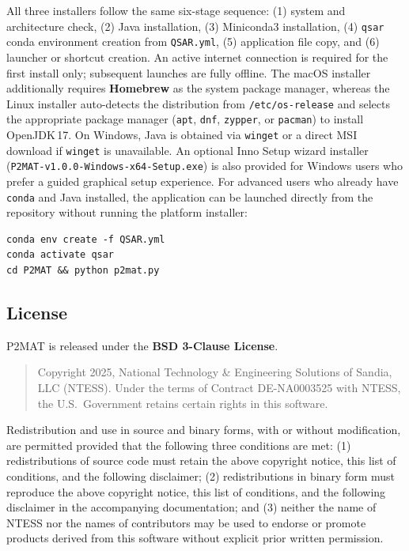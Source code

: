 All three installers follow the same six-stage sequence: (1) system and
architecture check, (2) Java installation, (3) Miniconda3 installation,
(4) \texttt{qsar} conda environment creation from \texttt{QSAR.yml},
(5) application file copy, and (6) launcher or shortcut creation.
An active internet connection is required for the first install only;
subsequent launches are fully offline.
The macOS installer additionally requires \textbf{Homebrew} as the system
package manager, whereas the Linux installer auto-detects the distribution
from \texttt{/etc/os-release} and selects the appropriate package manager
(\texttt{apt}, \texttt{dnf}, \texttt{zypper}, or \texttt{pacman}) to install
OpenJDK\,17.
On Windows, Java is obtained via \texttt{winget} or a direct MSI download
if \texttt{winget} is unavailable.
An optional Inno Setup wizard installer
(\texttt{P2MAT-v1.0.0-Windows-x64-Setup.exe}) is also provided for Windows
users who prefer a guided graphical setup experience.
For advanced users who already have \texttt{conda} and Java installed, the
application can be launched directly from the repository without running the
platform installer:

\begin{verbatim}
conda env create -f QSAR.yml
conda activate qsar
cd P2MAT && python p2mat.py
\end{verbatim}

\subsection{License}
\label{subsec:license}

P2MAT is released under the \textbf{BSD 3-Clause License}.

\begin{quote}
Copyright \textcopyright{} 2025, National Technology \& Engineering Solutions
of Sandia, LLC (NTESS).
Under the terms of Contract DE-NA0003525 with NTESS, the U.S.\ Government
retains certain rights in this software.
\end{quote}

Redistribution and use in source and binary forms, with or without
modification, are permitted provided that the following three conditions are
met:
(1) redistributions of source code must retain the above copyright notice, this
list of conditions, and the following disclaimer;
(2) redistributions in binary form must reproduce the above copyright notice,
this list of conditions, and the following disclaimer in the accompanying
documentation; and
(3) neither the name of NTESS nor the names of contributors may be used to
endorse or promote products derived from this software without explicit prior
written permission.

